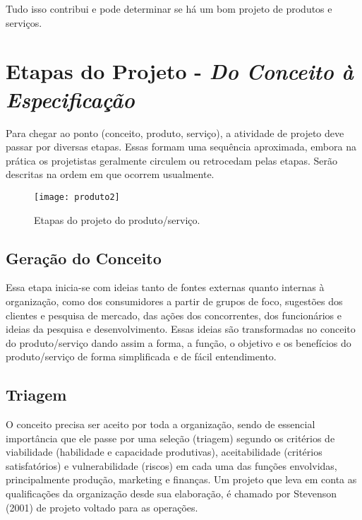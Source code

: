 		Tudo isso contribui e pode determinar se há um bom projeto de produtos e serviços. 

	\section[Etapas do Projeto]{Etapas do Projeto - \emph{Do Conceito à Especificação}}
	\label{sec:produtos_etapas}

		Para chegar ao ponto (conceito, produto, serviço), a atividade de projeto deve passar por diversas etapas. Essas formam uma sequência aproximada, embora na prática os projetistas geralmente circulem ou retrocedam pelas etapas. Serão descritas na ordem em que ocorrem usualmente.

		\begin{figure}[h]
			\centering
			\texttt{[image: produto2]}
			\caption[Etapas do projeto do produto/serviço]{Etapas do projeto do produto/serviço.}
			\label{fig:produto2}
		\end{figure}

		\subsection[Geração do Conceito]{Geração do Conceito}
		\label{sec:produtos_etapas_geracaoConceito}

			Essa etapa inicia-se com ideias tanto de fontes externas quanto internas à organização, como dos consumidores a partir de grupos de foco, sugestões dos clientes e pesquisa de mercado, das ações dos concorrentes, dos funcionários e ideias da pesquisa e desenvolvimento. Essas ideias são transformadas no conceito do produto/serviço dando assim a forma, a função, o objetivo e os benefícios do produto/serviço de forma simplificada e de fácil entendimento.

		\subsection[Triagem]{Triagem}
		\label{sec:produtos_etapas_triagem}

			O conceito precisa ser aceito por toda a organização, sendo de essencial importância que ele passe por uma seleção (triagem) segundo os critérios de viabilidade (habilidade e capacidade produtivas), aceitabilidade (critérios satisfatórios) e vulnerabilidade (riscos) em cada uma das funções envolvidas, principalmente produção, marketing e finanças. Um projeto que leva em conta as qualificações da organização desde sua elaboração, é chamado por Stevenson (2001) de projeto voltado para as operações. 

